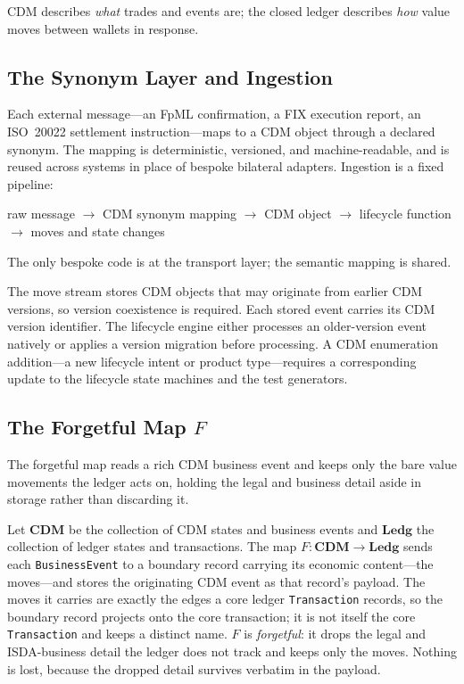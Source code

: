 CDM describes \textit{what} trades and events are; the closed ledger describes \textit{how} value moves between wallets in response.

\subsection{The Synonym Layer and Ingestion}

Each external message---an FpML confirmation, a FIX execution report, an ISO~20022 settlement instruction---maps to a CDM object through a declared synonym. The mapping is deterministic, versioned, and machine-readable, and is reused across systems in place of bespoke bilateral adapters. Ingestion is a fixed pipeline:

\begin{center}
raw message $\to$ CDM synonym mapping $\to$ CDM object $\to$ lifecycle function $\to$ moves and state changes
\end{center}

The only bespoke code is at the transport layer; the semantic mapping is shared.

The move stream stores CDM objects that may originate from earlier CDM versions, so version coexistence is required. Each stored event carries its CDM version identifier. The lifecycle engine either processes an older-version event natively or applies a version migration before processing. A CDM enumeration addition---a new lifecycle intent or product type---requires a corresponding update to the lifecycle state machines and the test generators.

\subsection{The Forgetful Map \texorpdfstring{$F$}{F}}

The forgetful map reads a rich CDM business event and keeps only the bare value movements the ledger acts on, holding the legal and business detail aside in storage rather than discarding it.

Let $\mathbf{CDM}$ be the collection of CDM states and business events and $\mathbf{Ledg}$ the collection of ledger states and transactions. The map $F : \mathbf{CDM} \to \mathbf{Ledg}$ sends each \texttt{BusinessEvent} to a boundary record carrying its economic content---the moves---and stores the originating CDM event as that record's payload. The moves it carries are exactly the edges a core ledger \texttt{Transaction} records, so the boundary record projects onto the core transaction; it is not itself the core \texttt{Transaction} and keeps a distinct name. $F$ is \textit{forgetful}: it drops the legal and ISDA-business detail the ledger does not track and keeps only the moves. Nothing is lost, because the dropped detail survives verbatim in the payload.

